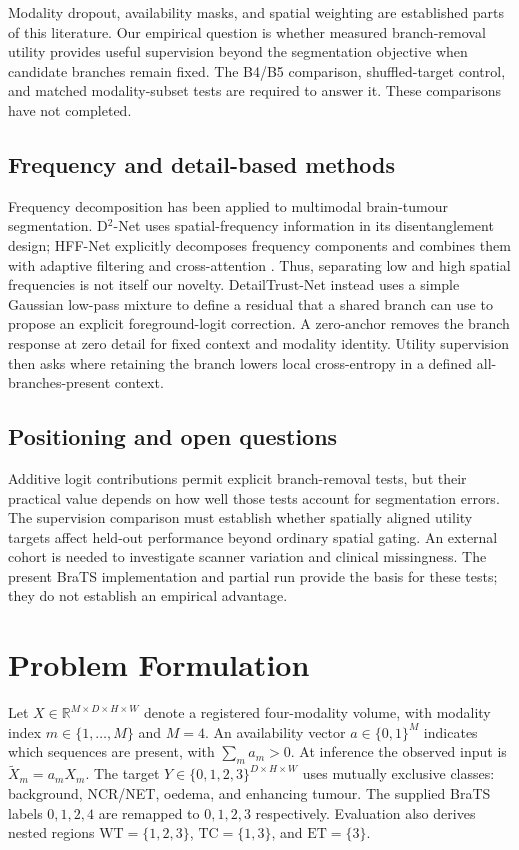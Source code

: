 \documentclass[conference]{IEEEtran}
\begin{document}
Modality dropout, availability masks, and spatial weighting are established parts of this literature. Our empirical question is whether measured branch-removal utility provides useful supervision beyond the segmentation objective when candidate branches remain fixed. The B4/B5 comparison, shuffled-target control, and matched modality-subset tests are required to answer it. These comparisons have not completed.

\subsection{Frequency and detail-based methods}
Frequency decomposition has been applied to multimodal brain-tumour segmentation. D$^2$-Net uses spatial-frequency information in its disentanglement design; HFF-Net explicitly decomposes frequency components and combines them with adaptive filtering and cross-attention \cite{yang2022d2,shao2025hff}. Thus, separating low and high spatial frequencies is not itself our novelty. DetailTrust-Net instead uses a simple Gaussian low-pass mixture to define a residual that a shared branch can use to propose an explicit foreground-logit correction. A zero-anchor removes the branch response at zero detail for fixed context and modality identity. Utility supervision then asks where retaining the branch lowers local cross-entropy in a defined all-branches-present context.

\subsection{Positioning and open questions}
Additive logit contributions permit explicit branch-removal tests, but their practical value depends on how well those tests account for segmentation errors. The supervision comparison must establish whether spatially aligned utility targets affect held-out performance beyond ordinary spatial gating. An external cohort is needed to investigate scanner variation and clinical missingness. The present BraTS implementation and partial run provide the basis for these tests; they do not establish an empirical advantage.

\section{Problem Formulation}
Let $X\in\mathbb{R}^{M\times D\times H\times W}$ denote a registered four-modality volume, with modality index $m\in\{1,\ldots,M\}$ and $M=4$. An availability vector $a\in\{0,1\}^M$ indicates which sequences are present, with $\sum_m a_m>0$. At inference the observed input is $\tilde X_m=a_m X_m$. The target $Y\in\{0,1,2,3\}^{D\times H\times W}$ uses mutually exclusive classes: background, NCR/NET, oedema, and enhancing tumour. The supplied BraTS labels $0,1,2,4$ are remapped to $0,1,2,3$ respectively. Evaluation also derives nested regions $\mathrm{WT}=\{1,2,3\}$, $\mathrm{TC}=\{1,3\}$, and $\mathrm{ET}=\{3\}$.
\end{document}
